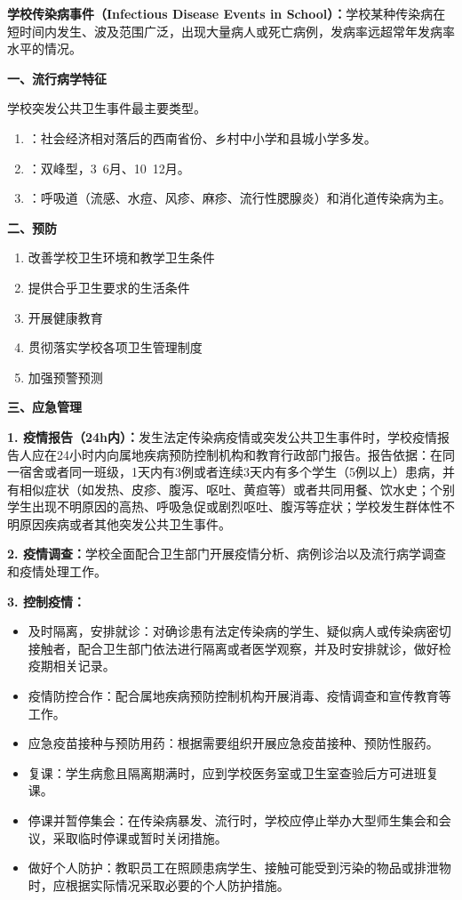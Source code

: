 \begin{keybox}
\textbf{学校传染病事件（Infectious Disease Events in School）：}学校某种传染病在短时间内发生、波及范围广泛，出现大量病人或死亡病例，发病率远超常年发病率水平的情况。

\textbf{一、流行病学特征}

学校突发公共卫生事件最主要类型。

\begin{enumerate}[leftmargin=*]
    \item {}：社会经济相对落后的西南省份、乡村中小学和县城小学多发。
    \item {}：双峰型，3~6月、10~12月。
    \item {}：呼吸道（流感、水痘、风疹、麻疹、流行性腮腺炎）和消化道传染病为主。
\end{enumerate}

\textbf{二、预防}

\begin{enumerate}[leftmargin=*]
    \item 改善学校卫生环境和教学卫生条件
    \item 提供合乎卫生要求的生活条件
    \item 开展健康教育
    \item 贯彻落实学校各项卫生管理制度
    \item 加强预警预测
\end{enumerate}

\textbf{三、应急管理}

\textbf{1. 疫情报告（24h内）：}发生法定传染病疫情或突发公共卫生事件时，学校疫情报告人应在24小时内向属地疾病预防控制机构和教育行政部门报告。报告依据：在同一宿舍或者同一班级，1天内有3例或者连续3天内有多个学生（5例以上）患病，并有相似症状（如发热、皮疹、腹泻、呕吐、黄疸等）或者共同用餐、饮水史；个别学生出现不明原因的高热、呼吸急促或剧烈呕吐、腹泻等症状；学校发生群体性不明原因疾病或者其他突发公共卫生事件。

\textbf{2. 疫情调查：}学校全面配合卫生部门开展疫情分析、病例诊治以及流行病学调查和疫情处理工作。

\textbf{3. 控制疫情：}
\begin{itemize}[leftmargin=*]
    \item 及时隔离，安排就诊：对确诊患有法定传染病的学生、疑似病人或传染病密切接触者，配合卫生部门依法进行隔离或者医学观察，并及时安排就诊，做好检疫期相关记录。
    \item 疫情防控合作：配合属地疾病预防控制机构开展消毒、疫情调查和宣传教育等工作。
    \item 应急疫苗接种与预防用药：根据需要组织开展应急疫苗接种、预防性服药。
    \item 复课：学生病愈且隔离期满时，应到学校医务室或卫生室查验后方可进班复课。
    \item 停课并暂停集会：在传染病暴发、流行时，学校应停止举办大型师生集会和会议，采取临时停课或暂时关闭措施。
    \item 做好个人防护：教职员工在照顾患病学生、接触可能受到污染的物品或排泄物时，应根据实际情况采取必要的个人防护措施。
\end{itemize}


\end{keybox}
